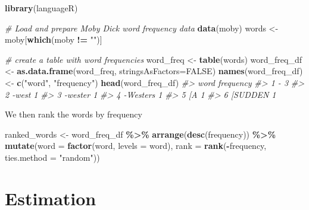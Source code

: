 \documentclass[
]{book}
\newenvironment{Shaded}{\begin{snugshade}}{\end{snugshade}}
\newcommand{\AttributeTok}[1]{\textcolor[rgb]{0.13,0.29,0.53}{#1}}
\newcommand{\CommentTok}[1]{\textcolor[rgb]{0.56,0.35,0.01}{\textit{#1}}}
\newcommand{\ConstantTok}[1]{\textcolor[rgb]{0.56,0.35,0.01}{#1}}
\newcommand{\FunctionTok}[1]{\textcolor[rgb]{0.13,0.29,0.53}{\textbf{#1}}}
\newcommand{\NormalTok}[1]{#1}
\newcommand{\OtherTok}[1]{\textcolor[rgb]{0.56,0.35,0.01}{#1}}
\newcommand{\SpecialCharTok}[1]{\textcolor[rgb]{0.81,0.36,0.00}{\textbf{#1}}}
\newcommand{\StringTok}[1]{\textcolor[rgb]{0.31,0.60,0.02}{#1}}
\begin{document}
\begin{Shaded}
\begin{Highlighting}[]
\FunctionTok{library}\NormalTok{(languageR)}

\CommentTok{\# Load and prepare Moby Dick word frequency data}
\FunctionTok{data}\NormalTok{(moby)}
\NormalTok{words }\OtherTok{\textless{}{-}}\NormalTok{ moby[}\FunctionTok{which}\NormalTok{(moby }\SpecialCharTok{!=} \StringTok{""}\NormalTok{)]}

\CommentTok{\# create a table with word frequencies}
\NormalTok{word\_freq }\OtherTok{\textless{}{-}} \FunctionTok{table}\NormalTok{(words)}
\NormalTok{word\_freq\_df }\OtherTok{\textless{}{-}} \FunctionTok{as.data.frame}\NormalTok{(word\_freq, }\AttributeTok{stringsAsFactors=}\ConstantTok{FALSE}\NormalTok{)}
\FunctionTok{names}\NormalTok{(word\_freq\_df) }\OtherTok{\textless{}{-}} \FunctionTok{c}\NormalTok{(}\StringTok{"word"}\NormalTok{, }\StringTok{"frequency"}\NormalTok{)}
\FunctionTok{head}\NormalTok{(word\_freq\_df)}
\CommentTok{\#\textgreater{}       word frequency}
\CommentTok{\#\textgreater{} 1        {-}         3}
\CommentTok{\#\textgreater{} 2    {-}west         1}
\CommentTok{\#\textgreater{} 3  {-}wester         1}
\CommentTok{\#\textgreater{} 4 {-}Westers         1}
\CommentTok{\#\textgreater{} 5       [A         1}
\CommentTok{\#\textgreater{} 6  [SUDDEN         1}
\end{Highlighting}
\end{Shaded}

We then rank the words by frequency

\begin{Shaded}
\begin{Highlighting}[]
\NormalTok{ranked\_words }\OtherTok{\textless{}{-}}\NormalTok{ word\_freq\_df }\SpecialCharTok{\%\textgreater{}\%}
  \FunctionTok{arrange}\NormalTok{(}\FunctionTok{desc}\NormalTok{(frequency)) }\SpecialCharTok{\%\textgreater{}\%}
  \FunctionTok{mutate}\NormalTok{(}\AttributeTok{word =} \FunctionTok{factor}\NormalTok{(word, }\AttributeTok{levels =}\NormalTok{ word),}
         \AttributeTok{rank =} \FunctionTok{rank}\NormalTok{(}\SpecialCharTok{{-}}\NormalTok{frequency, }\AttributeTok{ties.method =} \StringTok{"random"}\NormalTok{))}
\end{Highlighting}
\end{Shaded}

\section{Estimation}\label{estimation}
\end{document}
